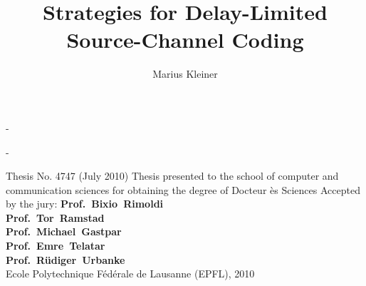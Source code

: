 \documentclass[ebook]{ipgthesis}
\title{Strategies for Delay-Limited Source-Channel Coding}
\author{}
\date{}
\begin{document}
\trimLmarks
\frontmatter
\begin{titlingpage}
\calccentering{\unitlength}
\begin{adjustwidth*}{\unitlength}{-\unitlength}
\maketitle
\end{adjustwidth*}
\end{titlingpage}

\author{Marius Kleiner}
\renewcommand{\maketitlehookc}
{%
\vskip 11cm
\begin{center}
Ecole Polytechnique F\'ed\'erale de Lausanne (EPFL)
\end{center}
\newpage
}
\begin{titlingpage}
\calccentering{\unitlength}
\begin{adjustwidth*}{\unitlength}{-\unitlength}
\maketitle
\end{adjustwidth*}
{
\noindent Thesis No. 4747 (July 2010)
\vskip 5cm
\noindent
Thesis presented to the school of computer and communication sciences for
obtaining the degree of Docteur \` es Sciences
\vskip 1cm
\noindent Accepted by the jury:
\vskip 0.4cm
\noindent \textbf{Prof.~Bixio~Rimoldi}
\\
\vskip 0.4cm
\noindent\textbf{Prof.~Tor~Ramstad}
\\
\vskip 0.4cm
\noindent\textbf{Prof.~Michael~Gastpar}
\\
\vskip 0.4cm
\noindent \textbf{Prof.~Emre~Telatar}
\\
\vskip 0.4cm
\noindent \textbf{Prof.~R\"udiger~Urbanke}
\\
\vskip 3cm
\noindent Ecole Polytechnique F\'ed\'erale de Lausanne (EPFL), 2010
}\end{titlingpage}



%



\cleardoublepage
\setpnumwidth{1.8em} %
\tableofcontents
\end{document}
